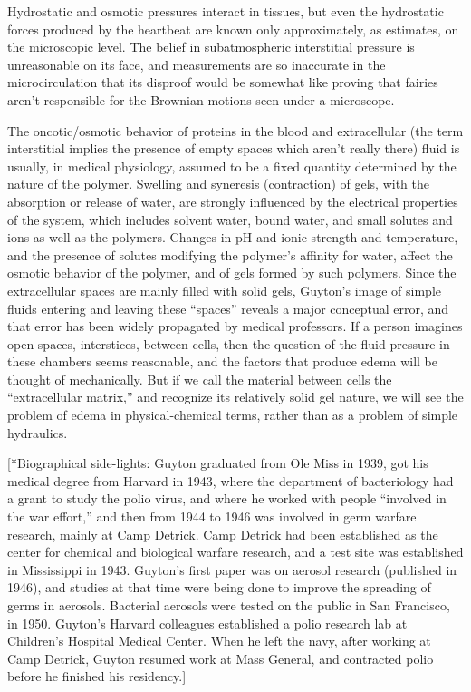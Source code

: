 \documentclass{article}
\begin{document}
Hydrostatic and osmotic pressures interact in tissues, but even the hydrostatic forces produced by the heartbeat are known only approximately, as estimates, on the microscopic level. The belief in subatmospheric interstitial pressure is unreasonable on its face, and measurements are so inaccurate in the microcirculation that its disproof would be somewhat like proving that fairies aren’t responsible for the Brownian motions seen under a microscope.

The oncotic/osmotic behavior of proteins in the blood and extracellular (the term interstitial implies the presence of empty spaces which aren’t really there) fluid is usually, in medical physiology, assumed to be a fixed quantity determined by the nature of the polymer. Swelling and syneresis (contraction) of gels, with the absorption or release of water, are strongly influenced by the electrical properties of the system, which includes solvent water, bound water, and small solutes and ions as well as the polymers. Changes in pH and ionic strength and temperature, and the presence of solutes modifying the polymer’s affinity for water, affect the osmotic behavior of the polymer, and of gels formed by such polymers. Since the extracellular spaces are mainly filled with solid gels, Guyton’s image of simple fluids entering and leaving these “spaces” reveals a major conceptual error, and that error has been widely propagated by medical professors. If a person imagines open spaces, interstices, between cells, then the question of the fluid pressure in these chambers seems reasonable, and the factors that produce edema will be thought of mechanically. But if we call the material between cells the “extracellular matrix,” and recognize its relatively solid gel nature, we will see the problem of edema in physical-chemical terms, rather than as a problem of simple hydraulics.

    [*Biographical side-lights: Guyton graduated from Ole Miss in 1939, got his medical degree from Harvard in 1943, where the department of bacteriology had a grant to study the polio virus, and where he worked with people “involved in the war effort,” and then from 1944 to 1946 was involved in germ warfare research, mainly at Camp Detrick. Camp Detrick had been established as the center for chemical and biological warfare research, and a test site was established in Mississippi in 1943. Guyton’s first paper was on aerosol research (published in 1946), and studies at that time were being done to improve the spreading of germs in aerosols. Bacterial aerosols were tested on the public in San Francisco, in 1950. Guyton’s Harvard colleagues established a polio research lab at Children’s Hospital Medical Center. When he left the navy, after working at Camp Detrick, Guyton resumed work at Mass General, and contracted polio before he finished his residency.]
\end{document}

